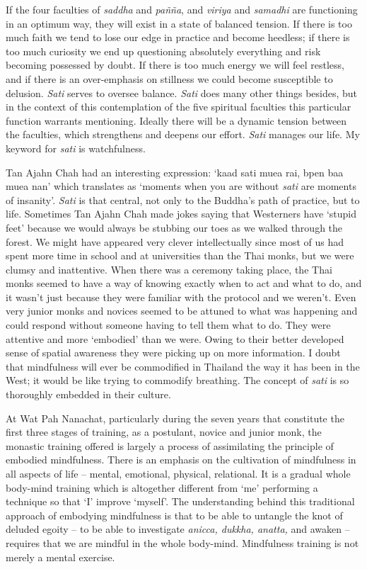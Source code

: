 If the four faculties of \emph{saddha} and \emph{pañña}, and
\emph{viriya} and \emph{samadhi} are functioning in an optimum way, they
will exist in a state of balanced tension. If there is too much faith we
tend to lose our edge in practice and become heedless; if there is too
much curiosity we end up questioning absolutely everything and risk
becoming possessed by doubt. If there is too much energy we will feel
restless, and if there is an over-emphasis on stillness we could become
susceptible to delusion. \emph{Sati} serves to oversee balance.
\emph{Sati} does many other things besides, but in the context of this
contemplation of the five spiritual faculties this particular function
warrants mentioning. Ideally there will be a dynamic tension between the
faculties, which strengthens and deepens our effort. \emph{Sati} manages
our life. My keyword for \emph{sati} is watchfulness.

Tan Ajahn Chah had an interesting expression: `kaad sati muea rai,
bpen baa muea nan' which translates as `moments when you are without
\emph{sati} are moments of insanity'. \emph{Sati} is that central, not
only to the Buddha's path of practice, but to life. Sometimes Tan Ajahn
Chah made jokes saying that Westerners have `stupid feet' because we
would always be stubbing our toes as we walked through the forest. We
might have appeared very clever intellectually since most of us had
spent more time in school and at universities than the Thai monks, but
we were clumsy and inattentive. When there was a ceremony taking place,
the Thai monks seemed to have a way of knowing exactly when to act and
what to do, and it wasn't just because they were familiar with the
protocol and we weren't. Even very junior monks and novices seemed to be
attuned to what was happening and could respond without someone having
to tell them what to do. They were attentive and more `embodied' than we
were. Owing to their better developed sense of spatial awareness they
were picking up on more information. I doubt that mindfulness will ever
be commodified in Thailand the way it has been in the West; it would be
like trying to commodify breathing. The concept of \emph{sati} is so
thoroughly embedded in their culture.

At Wat Pah Nanachat, particularly during the seven years that constitute
the first three stages of training, as a postulant, novice and junior
monk, the monastic training offered is largely a process of assimilating
the principle of embodied mindfulness. There is an emphasis on the
cultivation of mindfulness in all aspects of life -- mental, emotional,
physical, relational. It is a gradual whole body-mind training which is
altogether different from `me' performing a technique so that `I'
improve `myself'. The understanding behind this traditional approach of
embodying mindfulness is that to be able to untangle the knot of deluded
egoity -- to be able to investigate \emph{anicca, dukkha, anatta,} and
awaken -- requires that we are mindful in the whole body-mind.
Mindfulness training is not merely a mental exercise.

